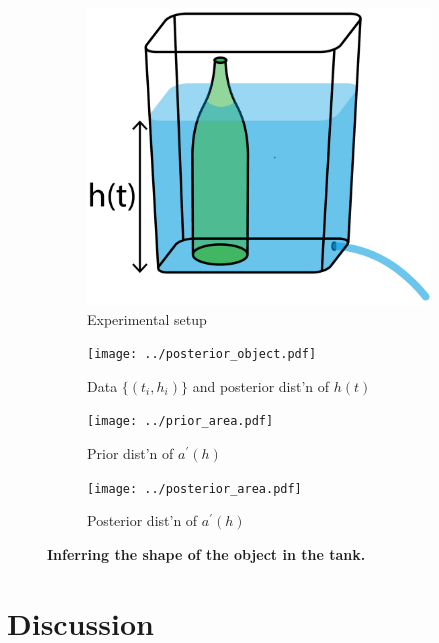\documentclass[openacc]{rsproca_new}%
\begin{document}
\begin{figure}[h!]
    \centering
        \begin{subfigure}[b]{0.3\textwidth}
    	\includegraphics[width=\textwidth]{../tank_geometry/tank_w_bottle.pdf}
	\caption{Experimental setup} \label{fig:tank_w_bottle}
    \end{subfigure}
     \begin{subfigure}[b]{0.49\textwidth}
    	\texttt{[image: ../posterior\_object.pdf]}
	\caption{Data $\{(t_i, h_i)\}$ and posterior dist'n of $h(t)$} \label{fig:posterior_object}
    \end{subfigure}
    
     \begin{subfigure}[b]{0.49\textwidth}
    	\texttt{[image: ../prior\_area.pdf]}
	\caption{Prior dist'n of $a^\prime(h)$} \label{fig:prior_area.pdf}
    \end{subfigure}
       \begin{subfigure}[b]{0.49\textwidth}
    	\texttt{[image: ../posterior\_area.pdf]}
	\caption{Posterior dist'n of $a^\prime(h)$} \label{fig:posterior_area.pdf}
    \end{subfigure}
    
  
    \caption{
      \textbf{Inferring the shape of the object in the tank.}
      }
\end{figure}

\section{Discussion}
\end{document}
